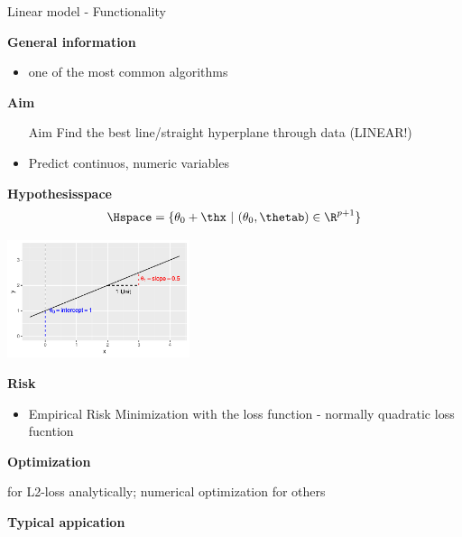 \documentclass[11pt,compress,t,notes=noshow, xcolor=table]{beamer}
\begin{document}
\begin{vbframe}{Linear model - Functionality}

\textbf{General information}
\begin{itemize}
\item one of the most common algorithms
\end{itemize}

\textbf{Aim}
\begin{itemize}
\item [Aim] Find the best line/straight hyperplane through data (LINEAR!)
\item Predict continuos, numeric variables
\end{itemize}

 
\textbf{Hypothesisspace}
$$\Hspace = \{ \theta_0 + \thx\ |\ (\theta_0, \thetab) \in \R^{p+1} \}$$

\centering \includegraphics[width=0.4\textwidth]{figure/reg_lm_plot} 

\framebreak

\textbf{Risk}
\begin{itemize}
\item Empirical Risk Minimization with the loss function - normally quadratic loss fucntion 
\end{itemize}

\textbf{Optimization}

for L2-loss analytically; numerical optimization for others 


\lz

\textbf{Typical appication}




\end{vbframe}
\end{document}
